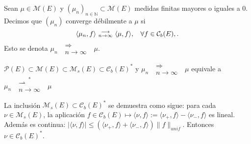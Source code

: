 \begin{definition}
Sean $\mu\in \mathcal{M}(E)$ y $(\mu_n)_{n \in \mathbb{N}}\subset \mathcal{M}(E)$ medidas finitas mayores o iguales a $0$. Decimos que $(\mu_n)$ converge débilmente a $\mu$ si 
$$\langle \mu_n,f\rangle \mbox{ }\substack{\longrightarrow \\ n\to\infty}\mbox{ } \langle \mu,f \rangle, \hspace{.25cm}\, \forall f \in \mathcal{C}_b(E), .$$
Esto se denota $\mu_n \mbox{ }\substack{\Longrightarrow \\n \to \infty}\mbox{ } \mu$.
\end{definition}
\begin{remark}
$\mathcal{P}(E)\subset \mathcal{M}(E) \subset \mathcal{M}_s(E) \subset\mathcal{C}_b(E)^*$ \espacio y \espacio$\mu_n \mbox{ }\substack{\Longrightarrow \\n \to \infty}\mbox{ } \mu$ equivale a $\displaystyle \mu_n \mbox{ }\overset{\ast}{\substack{\rightharpoonup\\n \to\infty}} \mbox{ }\mu$

La inclusión $\mathcal{M}_s(E) \subset\mathcal{C}_b(E)^*$ se demuestra como sigue: para cada $\nu\in\mathcal{M}_s(E)$, la aplicación $f\in\mathcal{C}_b(E)\mapsto\langle \nu,f\rangle:=\langle \nu_+,f\rangle-\langle \nu_-,f\rangle$ es lineal. Además es continua: $|\langle\nu,f\rangle|\leq (\langle \nu_+,f\rangle+\langle \nu_-,f\rangle)\|f\|_{unif}$. Entonces $\nu\in\mathcal{C}_b(E)^*$.
\end{remark}

